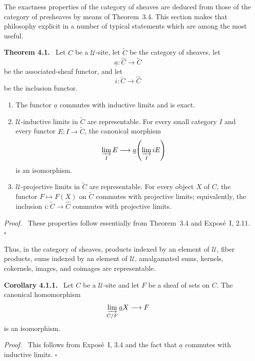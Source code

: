 \documentclass[11pt]{article}
\newcommand{\U}{\mathcal{U}}
\newcommand{\qedtext}{\hfill\(\square\)}
\newenvironment{statement}[1]{\par\medskip\noindent\textbf{#1.}\ }{\par\medskip}
\newenvironment{prooftext}{\par\noindent\emph{Proof.}\ }{\par\medskip}
\begin{document}
The exactness properties of the category of sheaves are deduced from those of the category of presheaves by means of Theorem~3.4. This section makes that philosophy explicit in a number of typical statements which are among the most useful.

\begin{statement}{Theorem 4.1}
Let \(C\) be a \(\U\)-site, let \(\widetilde C\) be the category of sheaves, let
\[
\underline a:\widehat C\longrightarrow \widetilde C
\]
be the associated-sheaf functor, and let
\[
i:\widetilde C\longrightarrow \widehat C
\]
be the inclusion functor.
\begin{enumerate}[label=\arabic*)]
\item The functor \(\underline a\) commutes with inductive limits and is exact.
\item \(\U\)-inductive limits in \(\widetilde C\) are representable. For every small category \(I\) and every functor \(E:I\to\widetilde C\), the canonical morphism
\[
\varinjlim_I E\longrightarrow \underline a\!\left(\varinjlim_I iE\right)
\]
is an isomorphism.
\item \(\U\)-projective limits in \(\widetilde C\) are representable. For every object \(X\) of \(C\), the functor \(F\mapsto F(X)\) on \(\widetilde C\) commutes with projective limits; equivalently, the inclusion \(i:\widetilde C\to \widehat C\) commutes with projective limits.
\end{enumerate}
\end{statement}

\begin{prooftext}
These properties follow essentially from Theorem~3.4 and Expos\'e~I, 2.11. \qedtext
\end{prooftext}

Thus, in the category of sheaves, products indexed by an element of \(\U\), fiber products, sums indexed by an element of \(\U\), amalgamated sums, kernels, cokernels, images, and coimages are representable.

\begin{statement}{Corollary 4.1.1}
Let \(C\) be a \(\U\)-site and let \(F\) be a sheaf of sets on \(C\). The canonical homomorphism
\[
\varinjlim_{C/F}\underline aX\longrightarrow F
\]
is an isomorphism.
\end{statement}

\begin{prooftext}
This follows from Expos\'e~I, 3.4 and the fact that \(\underline a\) commutes with inductive limits. \qedtext
\end{prooftext}
\end{document}
